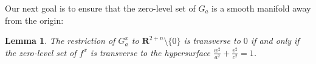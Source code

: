 \documentclass[reqno]{amsart}
\theoremstyle{theorem}
\newtheorem{lemma}[corollary]{Lemma}
\theoremstyle{remark}
\theoremstyle{definition}
\newcommand{\R}{\mathbf{R}}
\begin{document}
Our next goal is to ensure that the zero-level set of $G_a$ is a smooth manifold away from the origin:
\begin{lemma}\label{lem:propertyFa}
  The restriction of $G^x_a$ to $\R^{2+n}\setminus\{0\}$ is transverse to $0$ if and only if the zero-level set of $f^x$ is transverse to the hypersurface $ \frac{w^2}{a^2}+\frac{v^2}{c^2} = 1$.
\end{lemma}
\end{document}
